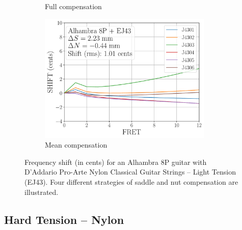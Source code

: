 \begin{figure}
\begin{subfigure}[b]{0.45\textwidth}
   \caption{Full compensation}
   \label{fig:shift_alhambra8p_ej43_full}
  \end{subfigure}
  \hspace{0.25in}
  \begin{subfigure}[b]{0.45\textwidth}
   \centering
   \includegraphics[width=3.25in]{../figures/shift_alhambra8p_ej43_mean}
   \caption{Mean compensation}
   \label{fig:shift_alhambra8p_ej43_mean}
  \end{subfigure}
  \caption{\label{fig:compensation_alhambra8p_ej43} Frequency shift (in cents) for an Alhambra 8P guitar with D'Addario Pro-Arte Nylon Classical Guitar Strings -- Light Tension (EJ43). Four different strategies of saddle and nut compensation are illustrated.}
 \end{figure}

 \newpage
 \subsection{Hard Tension -- Nylon}


